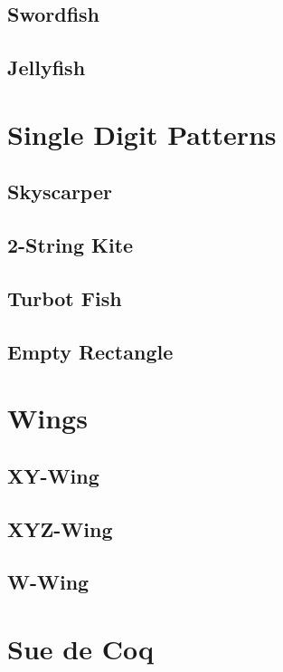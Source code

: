 \documentclass[accentcolor=tud6b,11pt,paper=a4]{tudreport}
\begin{document}
\newpage
\subsection{Swordfish}

\newpage
\subsection{Jellyfish}

\newpage
\section{Single Digit Patterns}

\newpage
\subsection{Skyscarper}

\newpage
\subsection{2-String Kite}

\newpage
\subsection{Turbot Fish}

\newpage
\subsection{Empty Rectangle}

\newpage
\section{Wings}

\newpage
\subsection{XY-Wing}

\newpage
\subsection{XYZ-Wing}

\newpage
\subsection{W-Wing}

\newpage
\section{Sue de Coq}
\end{document}

